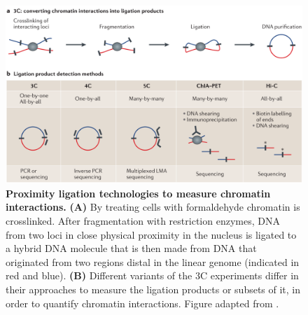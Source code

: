 \documentclass[a4paper,twoside=true,openright,parskip=full,chapterprefix=true,11pt,headings=normal,bibliography=totoc,listof=totoc,titlepage=on,captions=tableabove,draft=false]{scrreprt}
\theoremstyle{definition}
\theoremstyle{definition}
\theoremstyle{definition}
\theoremstyle{remark}
\begin{document}
\begin{figure}

{\centering \includegraphics[width=0.8\linewidth]{figures/Dekker2013_3C} 

}

\caption{\textbf{Proximity ligation technologies to
measure chromatin interactions.} \textbf{(A)} By treating cells with
formaldehyde chromatin is crosslinked. After fragmentation with
restriction enzymes, DNA from two loci in close physical proximity in
the nucleus is ligated to a hybrid DNA molecule that is then made from
DNA that originated from two regions distal in the linear genome
(indicated in red and blue). \textbf{(B)} Different variants of the 3C
experiments differ in their approaches to measure the ligation products
or subsets of it, in order to quantify chromatin interactions. Figure
adapted from \citep{Dekker2013}.}\label{fig:ProximityLigation}
\end{figure}
\end{document}
